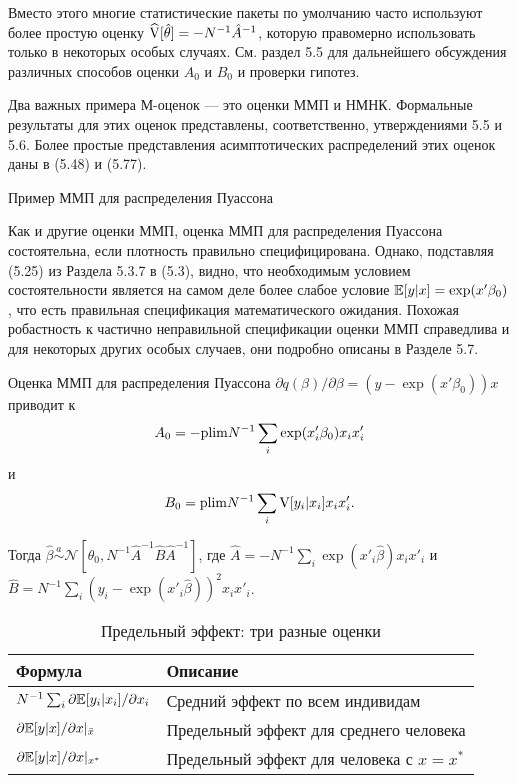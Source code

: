 Вместо этого многие статистические пакеты по умолчанию часто используют более простую оценку $\widehat{\mathrm{V}}[\hat{\theta}]=-N^{-1}\hat{A}^{-1}$, которую правомерно использовать только в некоторых особых случаях. См. раздел 5.5 для дальнейшего обсуждения различных способов оценки $A_0$ и $B_0$ и проверки гипотез.

Два важных примера М-оценок --- это оценки ММП и НМНК. Формальные результаты для этих оценок представлены, соответственно, утверждениями 5.5 и 5.6. Более простые представления асимптотических распределений этих оценок даны в (5.48) и (5.77).

\begin{center}
Пример ММП для распределения Пуассона 
\end{center}

Как и другие оценки ММП, оценка ММП для распределения Пуассона состоятельна, если плотность правильно специфицирована. Однако, подставляя (5.25) из Раздела 5.3.7 в (5.3), видно, что необходимым условием состоятельности является на самом деле более слабое условие  $\mathbb{E}[y|x]=\exp(x'\beta_0)$, что есть правильная спецификация математического ожидания. Похожая робастность к частично неправильной спецификации оценки ММП справедлива и для некоторых других особых случаев, они подробно описаны в Разделе 5.7.

Оценка ММП для распределения Пуассона $\partial q(\beta) / \partial \beta= (y-\exp(x'\beta_0))x$ приводит к 
\[
A_0=-\mathrm{plim } N^{-1} \sum_i \exp(x'_i\beta_0)x_i x'_i
\]
и
\[
B_0=\mathrm{plim } N^{-1} \sum_i \mathrm{V}[y_i|x_i] x_i x'_i.
\]
 
Тогда $\hat{\beta} \stackrel{a}{\sim}\mathcal{N}[\theta_0,N^{-1} \hat{A}^{-1} \hat{B} \hat{A}^{-1}]$, где $\hat{A}=- N^{-1} \sum_i \exp(x'_i \hat{\beta})x_i x'_i$ и $\hat{B}=N^{-1} \sum_i (y_i - \exp(x'_i \hat{\beta}))^2 x_i x'_i$.

\begin{table}[h]
\begin{center}
\caption{\label{tab:pred}Предельный эффект: три разные оценки}
\begin{tabular}[t]{ll}
\hline
\hline
\bf{Формула} & \bf{Описание} \\
\hline
$N^{-1} \sum_i \partial \mathbb{E}[y_i|x_i] / \partial x_i$ & Средний эффект по всем индивидам \\
$\partial \mathbb{E}[y|x] / \partial x |_{\bar{x}}$ & Предельный эффект для среднего человека \\
$\partial \mathbb{E}[y|x] / \partial x |_{x^*}$ & Предельный эффект для человека с $x=x^*$\\
\hline
\hline
\end{tabular}
\end{center}
\end{table}


